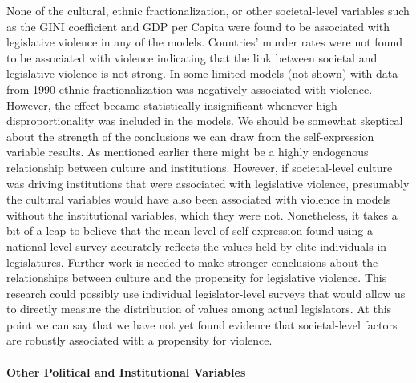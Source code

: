 \documentclass[a4paper]{article}\usepackage[]{graphicx}\usepackage[]{color}
\begin{document}
None of the cultural, ethnic fractionalization, or other societal-level variables such as the GINI coefficient and GDP per Capita were found to be associated with legislative violence in any of the models. Countries' murder rates were not found to be associated with violence indicating that the link between societal and legislative violence is not strong. In some limited models (not shown) with data from 1990 ethnic fractionalization was negatively associated with violence. However, the effect became statistically insignificant whenever high disproportionality was included in the models. We should be somewhat skeptical about the strength of the conclusions we can draw from the self-expression variable results. As mentioned earlier there might be a highly endogenous relationship between culture and institutions. However, if societal-level culture was driving institutions that were associated with legislative violence, presumably the cultural variables would have also been associated with violence in models without the institutional variables, which they were not. Nonetheless, it takes a bit of a leap to believe that the mean level of self-expression found using a national-level survey accurately reflects the values held by elite individuals in legislatures. Further work is needed to make stronger conclusions about the relationships between culture and the propensity for legislative violence. This research could possibly use individual legislator-level surveys that would allow us to directly measure the distribution of values among actual legislators. At this point we can say that we have not yet found evidence that societal-level factors are robustly associated with a propensity for violence.

\paragraph{Other Political and Institutional Variables}
\end{document}
